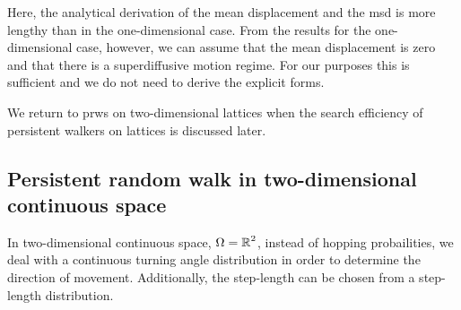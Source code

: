Here, the analytical derivation of the mean displacement and the \ac{msd} is more lengthy than in the one-dimensional case. From the results for the one-dimensional case, however, we can assume that the mean displacement is zero and that there is a superdiffusive motion regime. For our purposes this is sufficient and we do not need to derive the explicit forms.

We return to \acp{prw} on two-dimensional lattices when the search efficiency of persistent walkers on lattices is discussed later.

\subsection{Persistent random walk in two-dimensional continuous space}
In two-dimensional continuous space, \ie $\Omega = \operatorname{\mathbb{R}}^2$, instead of hopping probailities, we deal with a continuous turning angle distribution in order to determine the direction of movement. Additionally, the step-length can be chosen from a step-length distribution.

